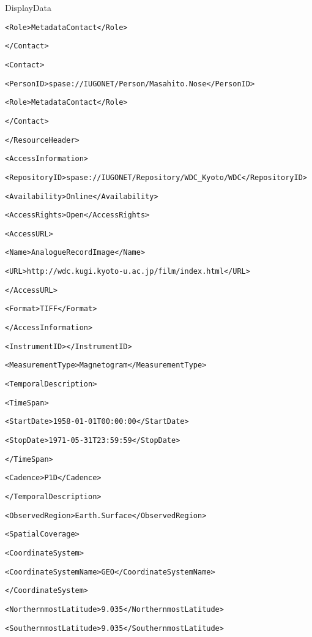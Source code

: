 \begin{itembox}[1]{DisplayData}
{\begin{alltt}
        <Role>MetadataContact</Role>
  		
      </Contact>
  		
      <Contact>
  			
        <PersonID>spase://IUGONET/Person/Masahito.Nose</PersonID>
  			
        <Role>MetadataContact</Role>
  		
      </Contact>
  	
    </ResourceHeader>
  	
    <AccessInformation>
  		
    <RepositoryID>spase://IUGONET/Repository/WDC_Kyoto/WDC</RepositoryID>
  		
    <Availability>Online</Availability>
  		
    <AccessRights>Open</AccessRights>
  		
    <AccessURL>
  			
      <Name>Analogue Record Image</Name>
  			
      <URL>http://wdc.kugi.kyoto-u.ac.jp/film/index.html</URL>
  		
      </AccessURL>
  		
      <Format>TIFF</Format>
  	
    </AccessInformation>
  
    <InstrumentID></InstrumentID>
  	
    <MeasurementType>Magnetogram</MeasurementType>
  	
    <TemporalDescription>
  		
      <TimeSpan>
  			
        <StartDate>1958-01-01T00:00:00</StartDate>
  			
        <StopDate>1971-05-31T23:59:59</StopDate>
  			
  		
      </TimeSpan>
  		
      <Cadence>P1D</Cadence>
  	
    </TemporalDescription>
  	
    <ObservedRegion>Earth.Surface</ObservedRegion>
  	
    <SpatialCoverage>
		
      <CoordinateSystem>
  			
        <CoordinateSystemName>GEO</CoordinateSystemName>
		
      </CoordinateSystem>
  		
      <NorthernmostLatitude>9.035</NorthernmostLatitude>
  		
      <SouthernmostLatitude>9.035</SouthernmostLatitude>
  		

\end{alltt}}
\end{itembox}
